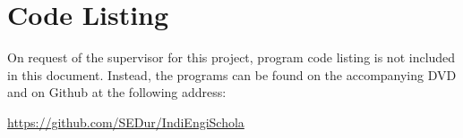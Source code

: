 %
%
%

\appendix

\chapter{Code Listing}

On request of the supervisor for this project, program code listing is not included in this document. Instead, the programs can be found on the accompanying DVD and on Github at the following address:\\
\begin{center}
\url{https://github.com/SEDur/IndiEngiSchola}
\end{center}
